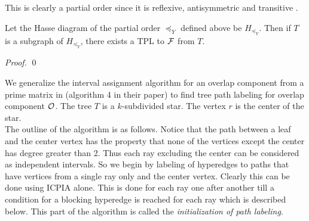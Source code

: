 \documentclass{llncs}
\def\cF{{\cal F}}
\def\cO{{\cal O}}
\newcommand{\rcomment}[1]{}
\newcommand{\rfootnote}[1] {} %
\begin{document}
{This is clearly a partial order since it is reflexive, antisymmetric and
transitive 
\rcomment{prove?}.

\begin{theorem}
  Let the Hasse diagram of the partial order $\preccurlyeq_Y$ defined
  above be $H_{\preccurlyeq_Y}$. Then if $T$ is a subgraph of
  $H_{\preccurlyeq_Y}$, there exists a TPL to $\cF$ from $T$.
\end{theorem}
\begin{proof}
 \qed
\end{proof}
}

\rfootnote{tried first/unexplored:
  let slot that gets
assigned to the path with $r$ be $Y_r$. If $T_i$ is rooted at $r$ we
have exactly three paths from $r$ to the three leaves which are vertex
disjoint except at $r$. -- but it is not straightforward to find this
special slot. end slots are easier to find see kklv10.}  
\rfootnote{tried: There will be three marginal sets and three end slots. pick one at
random. Let it be $Y = Y_i, i \in [k]$
Use the partial ordering idea in \cite{kklv10} (page 10 para 1)
$\le_{Y}$. However in this case it will not be a total order. 
Assign paths as in pg 10 eq (3). \\
Finding $Y$ involves something similar to the marginal hyperedge
idea in \cite{kklv10}.}

\noindent
We generalize the interval assignment algorithm for an overlap
component from a prime matrix in \cite{nsnrs09} (algorithm 4 in their paper) to find
tree path labeling for overlap component $\cO$. The tree $T$ is a
$k$-subdivided star. The vertex $r$ is the center of the star.\\

The outline of the algorithm is as follows. Notice that the path
between a leaf and the center vertex has the property that none of the
vertices except the center has degree greater than 2. Thus each ray excluding the center
can be considered as independent intervals. 
 So we begin by labeling of hyperedges to paths that have vertices
 from a single ray only and the center vertex. Clearly this can be
 done using ICPIA alone. This is done for each ray one
after another till a condition for a blocking hyperedge is reached
for each ray which is described below. This part of the algorithm is called the
{\em initialization of path labeling}. 
\end{document}
